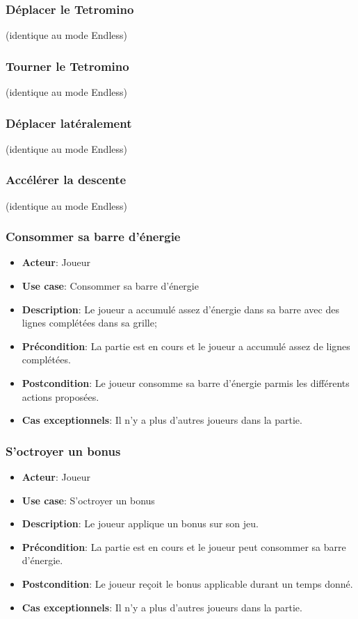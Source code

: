 \documentclass{article}
\begin{document}
\subsubsection*{Déplacer le Tetromino} (identique au mode Endless)
\subsubsection*{Tourner le Tetromino} (identique au mode Endless)
\subsubsection*{Déplacer latéralement} (identique au mode Endless)
\subsubsection*{Accélérer la descente} (identique au mode Endless)

\subsubsection*{Consommer sa barre d'énergie}
\begin{itemize}
    \item \textbf{Acteur}: Joueur
    \item \textbf{Use case}: Consommer sa barre d'énergie
    \item \textbf{Description}: Le joueur a accumulé assez d'énergie dans sa barre avec des lignes complétées dans sa grille;
    \item \textbf{Précondition}: La partie est en cours et le joueur a accumulé assez de lignes complétées.
    \item \textbf{Postcondition}: Le joueur consomme sa barre d'énergie parmis les différents actions proposées.
    \item \textbf{Cas exceptionnels}: Il n'y a plus d'autres joueurs dans la partie.
\end{itemize}

\subsubsection*{S'octroyer un bonus}
\begin{itemize}
    \item \textbf{Acteur}: Joueur
    \item \textbf{Use case}: S'octroyer un bonus
    \item \textbf{Description}: Le joueur applique un bonus sur son jeu.
    \item \textbf{Précondition}: La partie est en cours et le joueur peut consommer sa barre d'énergie.
    \item \textbf{Postcondition}: Le joueur reçoit le bonus applicable durant un temps donné. 
    \item \textbf{Cas exceptionnels}: Il n'y a plus d'autres joueurs dans la partie.
\end{itemize}
\end{document}
